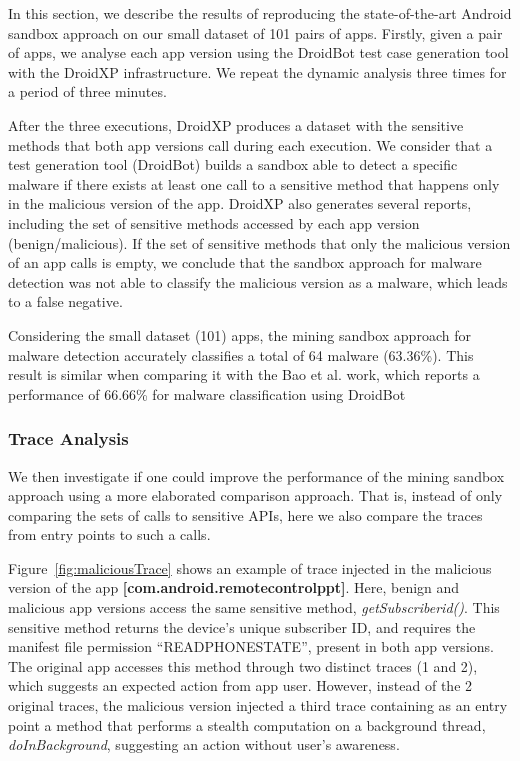 
In this section, we describe the results of reproducing the state-of-the-art Android sandbox approach on our small dataset of \num{101} pairs of apps.
Firstly, given a pair of apps, we analyse each app version using the DroidBot test case generation tool with the DroidXP infrastructure. We repeat
the dynamic analysis three times for a period of three minutes.

After the three executions, DroidXP produces a dataset with the sensitive methods that both app versions call during each execution. We consider that a test
generation tool (DroidBot) builds a sandbox able to detect a specific malware if there exists at least one call to a sensitive method that happens
only in the malicious version of the app. DroidXP also generates several reports, including the set of sensitive methods accessed by each app version (benign/malicious).
If the set of sensitive methods that only the malicious version of an app calls is empty,
we conclude that the sandbox approach for malware detection was not able to classify the malicious version as a malware, which leads to a false negative.

Considering the small dataset (101) apps, the mining sandbox approach for malware detection accurately classifies a total of \num{64} malware (\num{63.36}\%).
This result is similar when comparing it with the Bao et al. work, which reports a performance
of \num{66.66}\% for malware classification using
DroidBot~\cite{DBLP:conf/wcre/BaoLL18}

\subsubsection{Trace Analysis}

We then investigate if one could improve the performance of
the mining sandbox approach using a more elaborated comparison approach.
That is, instead of only comparing the sets of calls to sensitive APIs,
here we also compare the traces from entry points to such a calls.

Figure~\ref{fig:maliciousTrace} shows an example of trace injected in the malicious version of the app \textbf{[com.android.remotecontrolppt]}.
Here, benign and malicious app versions access the same sensitive method, \textit{getSubscriberid()}. This sensitive method returns the device's unique
subscriber ID, and requires the manifest file permission ``READ\underline{\space}PHONE\underline{\space}STATE'', present in both app versions.
The original app accesses this method through two distinct traces (1 and 2), which suggests an expected action from app user. However,
instead of the 2 original traces, the malicious version injected a third trace containing as an entry point a method that performs a stealth
computation on a background thread, \textit{doInBackground}, suggesting an action without user's awareness.


